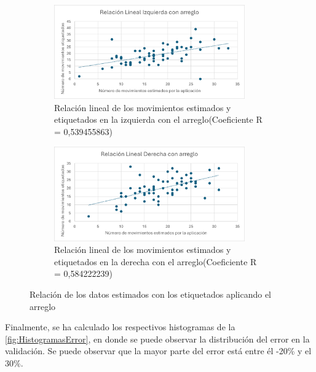 \begin{figure}[H]
    \centering
    \begin{subfigure}[b]{0.7\textwidth}
        \centering
        \includegraphics[width=0.9\textwidth]{images/7/IzquierdaBien.png}
        \caption{Relación lineal de los movimientos estimados y etiquetados en la izquierda con el arreglo(Coeficiente R = 0,539455863)}
    \end{subfigure}
    \begin{subfigure}[b]{0.7\textwidth}
        \centering
        \includegraphics[width=0.9\textwidth]{images/7/DerechaBien.png}
        \caption{Relación lineal de los movimientos estimados y etiquetados en la derecha con el arreglo(Coeficiente R = 0,584222239)}
    \end{subfigure}
    \caption{Relación de los datos estimados con los etiquetados aplicando el arreglo}
    \label{fig:EtiquetadosBien}
\end{figure}
\vspace{3\baselineskip}
Finalmente, se ha calculado los respectivos histogramas de la \autoref{fig:HistogramasError}, en donde se puede observar la distribución del error en la validación. Se puede observar que la mayor parte del error está entre él -20\% y el 30\%.

